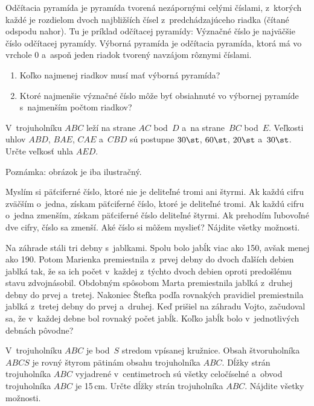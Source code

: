 {%
Odčítacia pyramída je pyramída tvorená nezápornými celými číslami, z~ktorých každé je rozdielom dvoch najbližších čísel z~predchádzajúceho riadka (čítané odspodu nahor).
Tu je príklad odčítacej pyramídy:
Význačné číslo je najväčšie číslo odčítacej pyramídy.
Výborná pyramída je odčítacia pyramída, ktorá má vo vrchole 0 a~aspoň jeden riadok tvorený navzájom rôznymi číslami.
\begin{enumerate}
\item Koľko najmenej riadkov musí mať výborná pyramída?
\item Ktoré najmenšie význačné číslo môže byť obsiahnuté vo výbornej pyramíde s~najmenším počtom riadkov?
\end{enumerate}
}

{%
V~trojuholníku $ABC$ leží na strane $AC$ bod~$D$ a~na strane~$BC$ bod~$E$.
Veľkosti uhlov $ABD$, $BAE$, $CAE$ a~$CBD$ sú postupne $30\st$, $60\st$, $20\st$ a~$30\st$.
Určte veľkosť uhla $AED$.

Poznámka: obrázok je iba ilustračný.
}

{%
Myslím si päťciferné číslo, ktoré nie je deliteľné tromi ani štyrmi.
Ak každú cifru zväčším o~jedna, získam päťciferné číslo, ktoré je deliteľné tromi.
Ak každú cifru o~jedna zmenším, získam päťciferné číslo deliteľné štyrmi.
Ak prehodím ľubovoľné dve cifry, číslo sa zmenší.
Aké číslo si môžem myslieť?
Nájdite všetky možnosti.
}

{%
Na záhrade stáli tri debny s~jablkami.
Spolu bolo jabĺk viac ako 150, avšak menej ako 190.
Potom Marienka premiestnila z~prvej debny do dvoch ďalších debien jablká tak, že sa ich počet v~každej z~týchto dvoch debien oproti predošlému stavu zdvojnásobil.
Obdobným spôsobom Marta premiestnila jablká z~druhej debny do prvej a~tretej.
Nakoniec Štefka podľa rovnakých pravidiel premiestnila jablká z~tretej debny do prvej a~druhej.
Keď prišiel na záhradu Vojto, začudoval sa, že v~každej debne bol rovnaký počet jabĺk.
Koľko jabĺk bolo v~jednotlivých debnách pôvodne?
}

{%
V~trojuholníku $ABC$ je bod~$S$ stredom vpísanej kružnice.
Obsah štvoruholníka $ABCS$ je rovný štyrom pätinám obsahu trojuholníka $ABC$.
Dĺžky strán trojuholníka $ABC$ vyjadrené v~centimetroch sú všetky celočíselné a~obvod trojuholníka $ABC$ je 15\,cm.
Určte dĺžky strán trojuholníka $ABC$.
Nájdite všetky možnosti.
}

